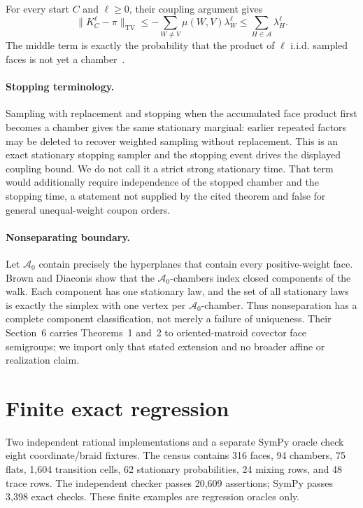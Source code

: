 \documentclass[10pt]{article}
\newcommand{\TV}{\mathrm{TV}}
\begin{document}
For every start $C$ and $\ell\ge0$, their coupling argument gives
\[
 \lVert K_C^\ell-\pi\rVert_{\TV}
 \le -\sum_{W\ne V}\mu(W,V)\lambda_W^\ell
 \le \sum_{H\in\mathcal A}\lambda_H^\ell .
\]
The middle term is exactly the probability that the product of $\ell$
i.i.d. sampled faces is not yet a chamber~\cite[Section~4B]{BD98}.

\paragraph{Stopping terminology.}
Sampling with replacement and stopping when the accumulated face product first
becomes a chamber gives the same stationary marginal: earlier repeated factors
may be deleted to recover weighted sampling without replacement.  This is an
exact stationary stopping sampler and the stopping event drives the displayed
coupling bound.  We do not call it a strict strong stationary time.  That term
would additionally require independence of the stopped chamber and the stopping
time, a statement not supplied by the cited theorem and false for general
unequal-weight coupon orders.

\paragraph{Nonseparating boundary.}
Let $\mathcal A_0$ contain precisely the hyperplanes that contain every
positive-weight face.  Brown and Diaconis show that the $\mathcal A_0$-chambers
index closed components of the walk.  Each component has one stationary law,
and the set of all stationary laws is exactly the simplex with one vertex per
$\mathcal A_0$-chamber.  Thus nonseparation has a complete component
classification, not merely a failure of uniqueness.  Their Section~6 carries
Theorems~1 and~2 to oriented-matroid covector face semigroups; we import only
that stated extension and no broader affine or realization claim.

\section{Finite exact regression}
Two independent rational implementations and a separate SymPy oracle check
eight coordinate/braid fixtures.  The census contains 316 faces, 94 chambers,
75 flats, 1,604 transition cells, 62 stationary probabilities, 24 mixing rows,
and 48 trace rows.  The independent checker passes 20,609 assertions; SymPy
passes 3,398 exact checks.  These finite examples are regression oracles only.
\end{document}
